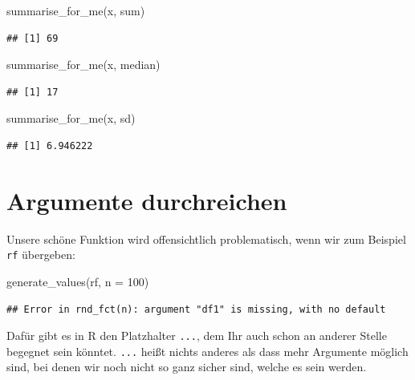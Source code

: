 \documentclass[
]{book}
\newenvironment{Shaded}{\begin{snugshade}}{\end{snugshade}}
\newcommand{\AttributeTok}[1]{\textcolor[rgb]{0.77,0.63,0.00}{#1}}
\newcommand{\DecValTok}[1]{\textcolor[rgb]{0.00,0.00,0.81}{#1}}
\newcommand{\FunctionTok}[1]{\textcolor[rgb]{0.00,0.00,0.00}{#1}}
\newcommand{\NormalTok}[1]{#1}
\begin{document}
\begin{Shaded}
\begin{Highlighting}[]
\FunctionTok{summarise\_for\_me}\NormalTok{(x, sum)}
\end{Highlighting}
\end{Shaded}

\begin{verbatim}
## [1] 69
\end{verbatim}

\begin{Shaded}
\begin{Highlighting}[]
\FunctionTok{summarise\_for\_me}\NormalTok{(x, median)}
\end{Highlighting}
\end{Shaded}

\begin{verbatim}
## [1] 17
\end{verbatim}

\begin{Shaded}
\begin{Highlighting}[]
\FunctionTok{summarise\_for\_me}\NormalTok{(x, sd)}
\end{Highlighting}
\end{Shaded}

\begin{verbatim}
## [1] 6.946222
\end{verbatim}

\hypertarget{argumente-durchreichen}{%
\section{Argumente durchreichen}\label{argumente-durchreichen}}

Unsere schöne Funktion wird offensichtlich problematisch, wenn wir zum Beispiel \texttt{rf} übergeben:

\begin{Shaded}
\begin{Highlighting}[]
\FunctionTok{generate\_values}\NormalTok{(rf, }\AttributeTok{n =} \DecValTok{100}\NormalTok{)}
\end{Highlighting}
\end{Shaded}

\begin{verbatim}
## Error in rnd_fct(n): argument "df1" is missing, with no default
\end{verbatim}

Dafür gibt es in R den Platzhalter \texttt{...}, dem Ihr auch schon an anderer Stelle begegnet sein könntet. \texttt{...} heißt nichts anderes als dass mehr Argumente möglich sind, bei denen wir noch nicht so ganz sicher sind, welche es sein werden.
\end{document}
